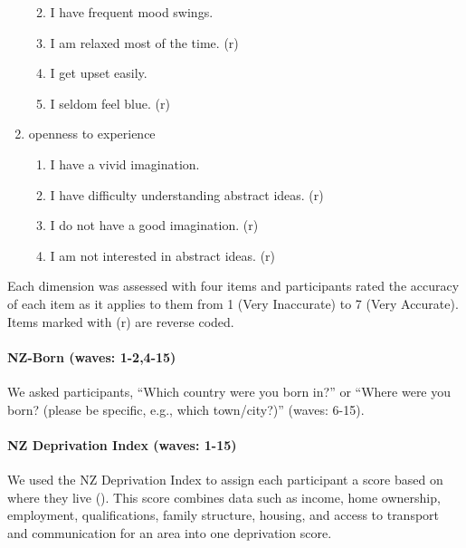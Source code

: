 \documentclass[
  single column]{article}
\let\oldparagraph\paragraph
\renewcommand{\paragraph}[1]{\oldparagraph{#1}\mbox{}}
\providecommand{\tightlist}{%
  \setlength{\itemsep}{0pt}\setlength{\parskip}{0pt}}\usepackage{longtable,booktabs,array}
\begin{document}
\begin{enumerate}
  \begin{enumerate}
  \def\labelenumii{\roman{enumii}.}
  \tightlist
  \item
    I have frequent mood swings.
  \item
    I am relaxed most of the time. (r)
  \item
    I get upset easily.
  \item
    I seldom feel blue. (r)
  \end{enumerate}
\item
  openness to experience

  \begin{enumerate}
  \def\labelenumii{\roman{enumii}.}
  \tightlist
  \item
    I have a vivid imagination.
  \item
    I have difficulty understanding abstract ideas. (r)
  \item
    I do not have a good imagination. (r)
  \item
    I am not interested in abstract ideas. (r)
  \end{enumerate}
\end{enumerate}

Each dimension was assessed with four items and participants rated the
accuracy of each item as it applies to them from 1 (Very Inaccurate) to
7 (Very Accurate). Items marked with (r) are reverse coded.

\paragraph{NZ-Born (waves: 1-2,4-15)}\label{nz-born-waves-1-24-15}

We asked participants, ``Which country were you born in?'' or ``Where
were you born? (please be specific, e.g., which town/city?)'' (waves:
6-15).

\paragraph{NZ Deprivation Index (waves:
1-15)}\label{nz-deprivation-index-waves-1-15}

We used the NZ Deprivation Index to assign each participant a score
based on where they live (). This score combines data such as income, home ownership,
employment, qualifications, family structure, housing, and access to
transport and communication for an area into one deprivation score.
\end{document}
